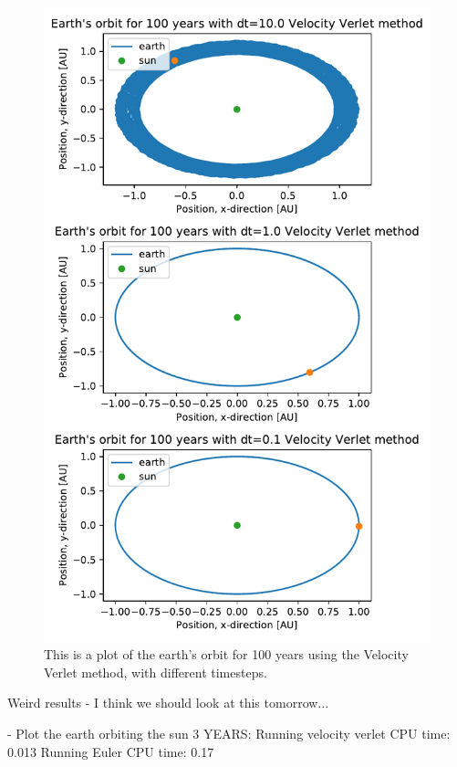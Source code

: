 \begin{figure}[H]
\includegraphics[width=1.1\linewidth]{../results/plots/different_timesteps_Velocity Verlet method.pdf}\caption{This is a plot of the earth's orbit for 100 years using the Velocity Verlet method, with different timesteps.}\label{fig:timesteps-verlet}
\end{figure}		

Weird results - I think we should look at this tomorrow...	
	
	- Plot the earth orbiting the sun
3 YEARS:
Running velocity verlet
CPU time: 0.013
Running Euler
CPU time: 0.17
		
